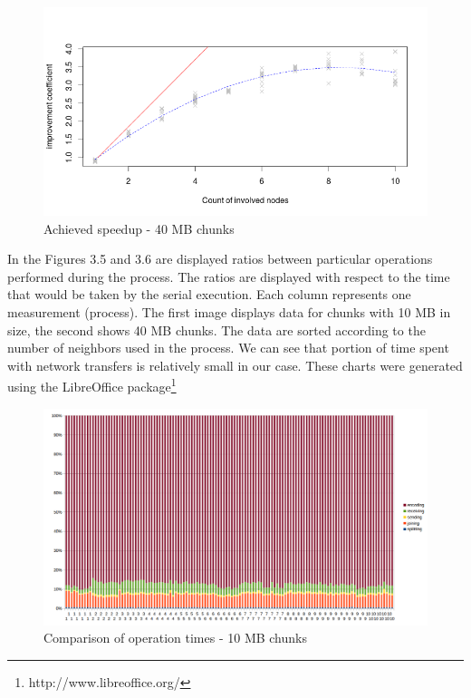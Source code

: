 \begin{figure}[h]
\begin{center}
\includegraphics[scale=0.45]{./img/Rplot40k.png}
\caption{Achieved speedup - 40 MB chunks}
\end{center}
\end{figure}

In the Figures 3.5 and 3.6 are displayed ratios between particular
operations performed during the process. The ratios are displayed with
respect to the time that would be taken by the serial execution. Each
column represents one measurement (process). The first image displays
data for chunks with 10 MB in size, the second shows 40 MB chunks. The
data are sorted according to the number of neighbors used in the
process. We can see that portion of time spent with network transfers is
relatively small in our case. These charts were generated using the
LibreOffice package\footnote{http://www.libreoffice.org/}

\begin{figure}[h]
\begin{center}
\includegraphics[scale=0.5]{./img/comparison_chart.png}
\caption{Comparison of operation times - 10 MB chunks}
\end{center}
\end{figure}

